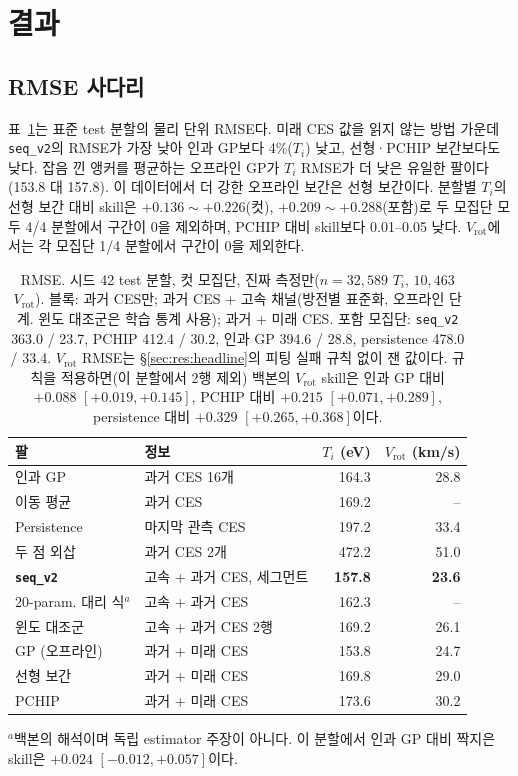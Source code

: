 \documentclass[10pt,twocolumn,letterpaper]{article}
\newcommand{\Ti}{\ensuremath{T_i}}
\newcommand{\Vrot}{\ensuremath{V_\mathrm{rot}}}
\newcommand{\seqv}{\texttt{seq\_v2}}
\begin{document}
\section{결과}
\label{sec:results}

\subsection{RMSE 사다리}
\label{sec:res:ladder}
표~\ref{tab:ladder}는 표준 test 분할의 물리 단위 RMSE다. 미래 CES 값을 읽지 않는 방법 가운데
\seqv{}의 RMSE가 가장 낮아 인과 GP보다 4\%(\Ti) 낮고, 선형·PCHIP 보간보다도
낮다. 잡음 낀 앵커를 평균하는 오프라인 GP가 \Ti{} RMSE가 더 낮은 유일한 팔이다(153.8 대
157.8). 이 데이터에서 더 강한 오프라인 보간은 선형 보간이다. 분할별 \Ti{}의 선형 보간 대비
skill은 $+0.136\sim+0.226$(컷), $+0.209\sim+0.288$(포함)로 두 모집단 모두 4/4 분할에서
구간이 0을 제외하며, PCHIP 대비 skill보다 0.01--0.05 낮다. \Vrot{}에서는 각 모집단 1/4
분할에서 구간이 0을 제외한다.

\begin{table}[t]
  \centering
  \caption{RMSE. 시드 42 test 분할, 컷 모집단, 진짜 측정만($n = 32{,}589$ \Ti{},
  $10{,}463$ \Vrot{}). 블록: 과거 CES만; 과거 CES + 고속 채널(방전별 표준화, 오프라인
  단계. 윈도 대조군은 학습 통계 사용); 과거 + 미래 CES. 포함 모집단: \seqv{} 363.0 / 23.7,
  PCHIP 412.4 / 30.2, 인과 GP 394.6 / 28.8, persistence 478.0 / 33.4. \Vrot{} RMSE는
  \S\ref{sec:res:headline}의 피팅 실패 규칙 없이 잰 값이다. 규칙을 적용하면(이 분할에서 2행
  제외) 백본의 \Vrot{} skill은 인과 GP 대비 $+0.088$ $[+0.019, +0.145]$, PCHIP 대비
  $+0.215$ $[+0.071, +0.289]$, persistence 대비 $+0.329$ $[+0.265, +0.368]$이다.}
  \label{tab:ladder}
  \footnotesize
  \setlength{\tabcolsep}{2.4pt}
  \begin{tabular}{llrr}
    \toprule
    팔 & 정보 & \Ti{} (eV) & \Vrot{} (km/s) \\
    \midrule
    인과 GP & 과거 CES 16개 & 164.3 & 28.8 \\
    이동 평균 & 과거 CES & 169.2 & -- \\
    Persistence & 마지막 관측 CES & 197.2 & 33.4 \\
    두 점 외삽 & 과거 CES 2개 & 472.2 & 51.0 \\
    \midrule
    \textbf{\seqv{}} & 고속 + 과거 CES, 세그먼트 & \textbf{157.8} & \textbf{23.6} \\
    20-param. 대리 식$^{a}$ & 고속 + 과거 CES & 162.3 & -- \\
    윈도 대조군 & 고속 + 과거 CES 2행 & 169.2 & 26.1 \\
    \midrule
    GP (오프라인) & 과거 + 미래 CES & 153.8 & 24.7 \\
    선형 보간 & 과거 + 미래 CES & 169.8 & 29.0 \\
    PCHIP & 과거 + 미래 CES & 173.6 & 30.2 \\
    \bottomrule
  \end{tabular}

  \smallskip\raggedright\scriptsize $^{a}$백본의 해석이며 독립 estimator 주장이 아니다.
  이 분할에서 인과 GP 대비 짝지은 skill은 $+0.024$ $[-0.012, +0.057]$이다.
\end{table}
\end{document}

